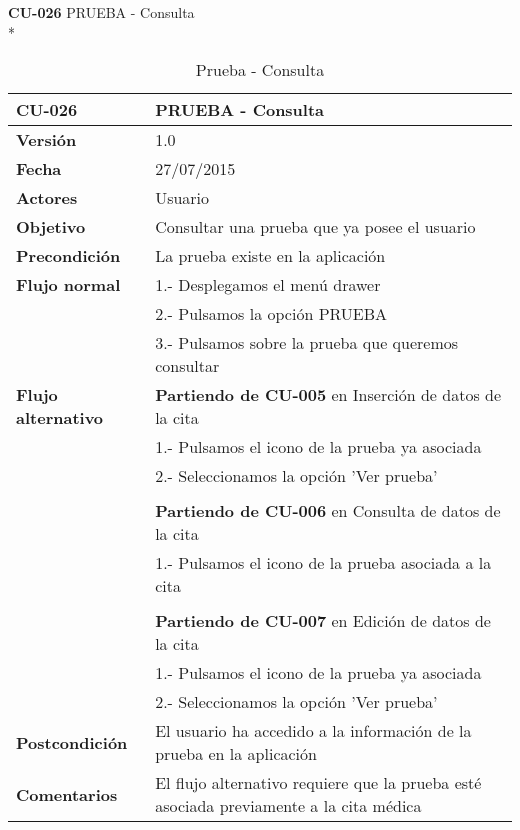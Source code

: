 \documentclass[../pfc.tex]{subfiles}
\begin{document}
	\textbf{CU-026}	PRUEBA - Consulta\\*
	
	\begin{table}[H]
		\centering
		\begin{tabular}[t]{|p{3cm}|p{9.5cm}|}
			\hline \textbf{CU-026} & \textbf{PRUEBA - Consulta} \\*
			\hline\hline \textbf{Versión} & 1.0 \\*
			\hline\hline \textbf{Fecha} & 27/07/2015 \\*
			\hline\textbf{Actores} 	& Usuario\\*
			\hline \textbf{Objetivo} & Consultar una prueba que ya posee el usuario\\* 			
			\hline \textbf{Precondición} & La prueba existe en la aplicación\\* 
			\hline \textbf{Flujo normal} & 1.- Desplegamos el menú drawer \\* 
			& 2.- Pulsamos la opción PRUEBA\\*	
			& 3.- Pulsamos sobre la prueba que queremos consultar\\*	
			\hline \textbf{Flujo alternativo} & \textbf{Partiendo de CU-005} en Inserción de datos de la cita\\* 
			& 1.- Pulsamos el icono de la prueba ya asociada\\*	
			& 2.- Seleccionamos la opción 'Ver prueba'\\*
			& \\*
			& \textbf{Partiendo de CU-006} en Consulta de datos de la cita\\* 
			& 1.- Pulsamos el icono de la prueba asociada a la cita\\*	
			& \\*
			& \textbf{Partiendo de CU-007} en Edición de datos de la cita\\* 
			& 1.- Pulsamos el icono de la prueba ya asociada\\*	
			& 2.- Seleccionamos la opción 'Ver prueba'\\*
			\hline \textbf{Postcondición} & El usuario ha accedido a la información de la prueba en la aplicación \\* 
			\hline \textbf{Comentarios}   & El flujo alternativo requiere que la prueba esté asociada previamente a la cita médica\\*
			\hline
		\end{tabular}
		\caption{Prueba - Consulta}
		\label{tabla:caso026}
	\end{table}
	
\end{document}
